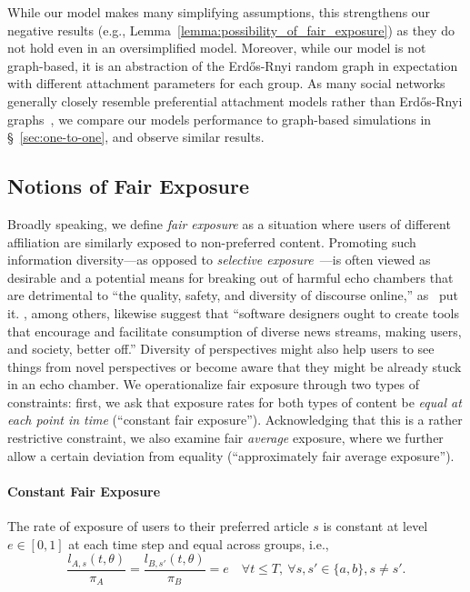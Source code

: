 \documentclass[letterpaper]{article} %
\begin{document}
While our model makes many simplifying assumptions, this strengthens our negative results (e.g., Lemma~\ref{lemma:possibility_of_fair_exposure}) as they do not hold even in an oversimplified model.
Moreover, while our model is not graph-based, it is an abstraction of the Erd\H{o}s-Rnyi random graph in expectation with different attachment parameters for each group.
As many social networks generally closely resemble preferential attachment models rather than Erd\H{o}s-Rnyi graphs~\citep{clauset_larremore}, we compare our models performance to graph-based simulations in \S~\ref{sec:one-to-one}, and observe similar results.

\subsection{Notions of Fair Exposure}
Broadly speaking, we define \emph{fair exposure} as a situation where users of different affiliation are similarly exposed to non-preferred content.
Promoting such information diversity---as opposed to \emph{selective exposure}~\citep{freedman1965selective}---is often viewed as desirable and a potential means for breaking out of harmful echo chambers that are detrimental to ``the quality, safety, and diversity of discourse online,'' as~\citet{gillani2018me} put it.
\citet{garrett2011resisting}, among others, likewise suggest that ``software designers ought to create tools that
encourage and facilitate consumption of diverse news streams, making users, and society, better off.''
Diversity of perspectives might also help users to see things from novel perspectives or become aware that they might be already stuck in an echo chamber.
We operationalize fair exposure through two types of constraints: first, we ask that exposure rates for both types of content be \emph{equal at each point in time} (``constant fair exposure'').
Acknowledging that this is a rather restrictive constraint, we also examine fair \emph{average} exposure, where we further allow a certain deviation from equality (``approximately fair average exposure'').

\paragraph{Constant Fair Exposure}
The rate of exposure of users  to their preferred article $s$ is constant at level $e\in [0,1]$ at each time step and equal across groups, i.e.,
\footnotesize
\begin{equation}
    \label{eq:constant_exposure}
    \frac{l_{A,s}(t,\theta)}{\pi_A} = \frac{l_{B,s'}(t,\theta)}{\pi_B}=e\quad
    \forall t \leq T,\ \forall s,s'\in\{a,b\}, s\neq s'.
\end{equation}
\normalsize
\end{document}
